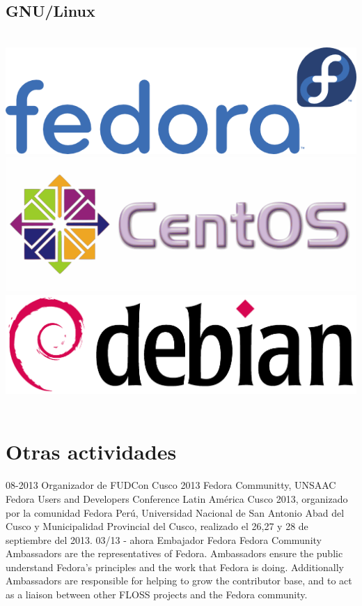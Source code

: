 \documentclass[]{friggeri-cv}
\begin{document}
\begin{aside}
    \section{GNU/Linux}
    ~
    \includegraphics[scale=0.12]{img/fedora}
    \includegraphics[scale=0.12]{img/centos}
    \includegraphics[scale=0.020]{img/debian}
    ~
\end{aside}

\newpage
\section{Otras actividades}
\begin{entrylist}
    \entry
    {08-2013}
    {Organizador de FUDCon Cusco 2013}
    {Fedora Communitty, UNSAAC}
    {Fedora Users and Developers Conference Latin América Cusco 2013, organizado
    por la comunidad Fedora Perú, Universidad Nacional de San Antonio Abad del
    Cusco y Municipalidad Provincial del Cusco, realizado el 26,27 y 28 de
    septiembre del 2013.}
    \entry
    {03/13 - ahora}
    {Embajador Fedora}
    {Fedora Community}
    {Ambassadors are the representatives of Fedora. Ambassadors ensure the public
    understand Fedora's principles and the work that Fedora is doing. Additionally
    Ambassadors are responsible for helping to grow the contributor base, and to
    act as a liaison between other FLOSS projects and the Fedora community. }
\end{entrylist}
%
\end{document}
